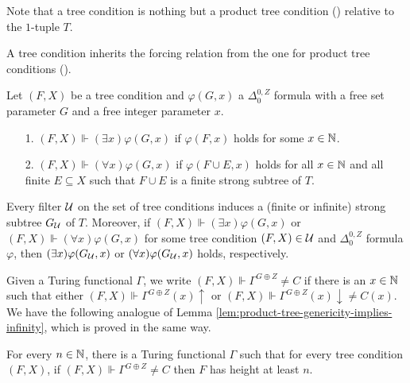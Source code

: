 \noindent Note that a tree condition is nothing but a product tree condition () relative to the $1$-tuple $T$.

A tree condition inherits the forcing relation
from the one for product tree conditions ().

\begin{definition}\label{def:mtt1-sca-forcing-relation}
Let $(F, X)$ be a tree condition and $\varphi(G, x)$ a $\Delta^{0,Z}_0$ formula with a free set parameter $G$ and a free integer parameter $x$.
\begin{itemize}
	\item[1.] $(F, X) \Vdash (\exists x)\varphi(G, x)$ if $\varphi(F, x)$ holds for some $x \in \mathbb{N}$.
	\item[2.] $(F, X) \Vdash (\forall x)\varphi(G, x)$ if $\varphi(F \cup E, x)$ holds for all $x \in \mathbb{N}$ and all finite $E \subseteq X$ such that $F \cup E$ is a finite strong subtree of $T$.
\end{itemize}
\end{definition}

Every filter $\mathcal{U}$ on the set of tree conditions
induces a (finite or infinite) strong subtree $G_{\mathcal{U}}$ of $T$.
Moreover, if $(F, X) \Vdash (\exists x)\varphi(G, x)$ or $(F, X) \Vdash (\forall x)\varphi(G, x)$
for some tree condition $(F, X) \in \mathcal{U}$ and $\Delta^{0,Z}_0$ formula $\varphi$, then $(\exists x)\varphi(G_{\mathcal{U}}, x)$ or $(\forall x)\varphi(G_{\mathcal{U}}, x)$ holds, respectively.

Given a Turing functional $\Gamma$, we write $(F, X) \Vdash \Gamma^{G \oplus Z} \neq C$
if there is an $x \in \mathbb{N}$ such that either $(F, X) \Vdash \Gamma^{G \oplus Z}(x)\uparrow$ or $(F, X) \Vdash \Gamma^{G \oplus Z}(x)\downarrow \neq C(x)$. We have the following analogue of Lemma \ref{lem:product-tree-genericity-implies-infinity}, which is proved in the same way.

\begin{lemma}\label{lem:mtt1-sca-genericity-implies-infinity}
For every $n \in \mathbb{N}$, there is a Turing functional $\Gamma$ such that
for every tree condition $(F, X)$, if $(F, X) \Vdash \Gamma^{G \oplus Z} \neq C$
then $F$ has height at least $n$.
\end{lemma}

